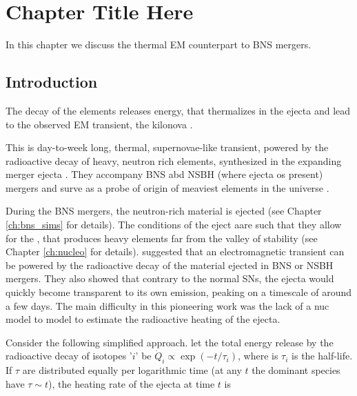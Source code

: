 
\chapter{Chapter Title Here} %

\label{ch:kilonova} %

In this chapter we discuss the thermal \ac{EM} counterpart to \ac{BNS} mergers.

\section{Introduction}


The decay of the \rproc{} elements releases energy, that thermalizes in the ejecta 
and lead to the observed \ac{EM} transient, the kilonova \citep[\eg][]{Metzger:2016pju}.

This is day-to-week long, thermal, supernovae-like transient, powered by the radioactive decay of heavy, neutron rich elements, synthesized in the expanding merger ejecta \citep{Li:1998bw}. They accompany BNS abd NSBH (where ejecta os present) mergers and surve as a probe of origin of meaviest elements in the universe \cite{Metzger:2010}.

During the \ac{BNS} mergers, the neutron-rich material is ejected (see Chapter \ref{ch:bns_sims} for details).
The conditions of the eject aare such that they allow for the \rproc{}, that produces heavy elements 
far from the valley of stability (see Chapter \ref{ch:nucleo} for details).
\citet{Li:1998bw} suggested that an electromagnetic transient can be powered by the radioactive decay of the material ejected in \ac{BNS} or \ac{NSBH} mergers. They also showed that contrary to the normal \acp{SN}, the ejecta would quickly become transparent to its own emission, peaking on a timescale of around a few days. 
The main difficulty in this pioneering work was the lack of a \ac{nuc} model to model to estimate the radioactive heating of the ejecta. 

Consider the following simplified approach. let the total energy release by the radioactive decay of isotopes '$i$' be $\dot{Q}_i \propto \exp(-t/\tau_i)$, where is $\tau_i$ is the half-life. If $\tau$ are distributed equally per logarithmic time (at any $t$ the dominant species have $\tau\sim t$), the heating rate of the ejecta at time $t$ is


